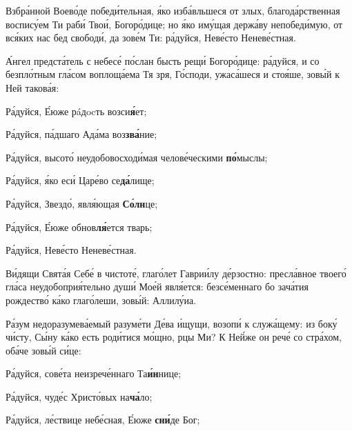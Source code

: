 \begin{russian}


  Взбра́нной Воево́де победи́тельная, я́ко изба́вльшеся от злых, благода́рственная воспису́ем Ти раби́ Твои́, Богоро́дице; но я́ко иму́щая держа́ву непобеди́мую, от вся́ких нас бед свободи́, да зове́м Ти: ра́дуйся, Неве́сто Неневе́стная.


  \Ierei А́нгел предста́тель с небесе́ по́слан бысть рещи́ Богоро́дице: ра́дуйся, и со безпло́тным гла́сом воплоща́ема Тя зря, Го́споди, ужаса́шеся и стоя́ше, зовы́й к Ней такова́я:

  \KhorRaduisya Ра́дуйся, Е́юже рáдocть возси\textbf{я́}ет;


  Ра́дуйся, па́дшаго Ада́ма воз\textbf{зва́}ние;


  Ра́дуйся, высото́ неудобовосходи́мая челове́ческими \textbf{по́}мыслы;


  Ра́дуйся, я́ко еси́ Царе́во се\textbf{да́}лище;


  Ра́дуйся, Звездо́, явля́ющая \textbf{Со́лн}це;


  Ра́дуйся, Е́юже обнов\textbf{ля́}ется тварь;


  Ра́дуйся, Неве́сто Неневе́стная.


  \Ierei Ви́дящи Свята́я Себе́ в чистоте́, глаго́лет Гаврии́лу де́рзостно: пресла́вное твоего́ гла́са неудобоприя́тельно души́ Мое́й явля́ется: безсе́меннаго бо зача́тия рождество́ ка́ко глаго́леши, зовы́й: Аллилу́иа.


  \Ierei Ра́зум недоразумева́емый разуме́ти Де́ва и́щущи, возопи́ к служа́щему: из боку́ чи́сту, Сы́ну ка́ко есть роди́тися мо́щно, рцы Ми? К Ней́же он рече́ со стра́хом, оба́че зовы́й си́це:

  \KhorRaduisya Ра́дуйся, сове́та неизрече́ннаго Та\textbf{и́н}нице;


  Ра́дуйся, чуде́с Христо́вых на\textbf{ча́}ло;


  Ра́дуйся, ле́ствице небе́сная, Е́юже \textbf{сни́}де Бог;


\end{russian}
\pagebreak

